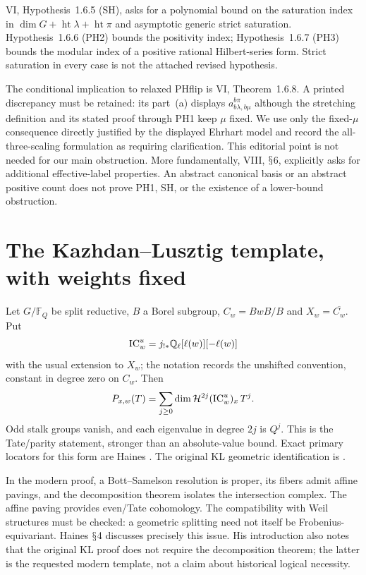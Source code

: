 \documentclass[11pt,a4paper]{article}
\newcommand{\Q}{\mathbb Q}\newcommand{\Z}{\mathbb Z}\newcommand{\C}{\mathbb C}\newcommand{\N}{\mathbb N}\newcommand{\F}{\mathbb F}
\renewcommand{\S}{\ensuremath{\mathsection}}
\theoremstyle{named}\newtheorem{finding}{Finding}[section]
\theoremstyle{definition}\newtheorem{definition}[finding]{Definition}
\theoremstyle{remark}\newtheorem{remark}[finding]{Remark}
\begin{document}
VI, Hypothesis~1.6.5 (SH), asks for a polynomial bound on the saturation index in $\dim G+\operatorname{ht}\lambda+\operatorname{ht}\pi$ and asymptotic generic strict saturation. Hypothesis~1.6.6 (PH2) bounds the positivity index; Hypothesis~1.6.7 (PH3) bounds the modular index of a positive rational Hilbert-series form. Strict saturation in every case is not the attached revised hypothesis.

The conditional implication to relaxed PHflip is VI, Theorem~1.6.8. A printed discrepancy must be retained: its part~(a) displays $a_{b\lambda,b\mu}^{b\pi}$ although the stretching definition and its stated proof through PH1 keep $\mu$ fixed. We use only the fixed-$\mu$ consequence directly justified by the displayed Ehrhart model and record the all-three-scaling formulation as requiring clarification. This editorial point is not needed for our main obstruction. More fundamentally, VIII, \S6, explicitly asks for additional effective-label properties. An abstract canonical basis or an abstract positive count does not prove PH1, SH, or the existence of a lower-bound obstruction.

\section{The Kazhdan--Lusztig template, with weights fixed}\label{sec:KL}
Let $G/\F_Q$ be split reductive, $B$ a Borel subgroup, $C_w=BwB/B$ and $X_w=\overline{C_w}$. Put
\[
 \IC_w^u=j_{!*}\Q_\ell[\ell(w)][-\ell(w)]
\]
with the usual extension to $X_w$; the notation records the unshifted convention, constant in degree zero on $C_w$. Then
\begin{equation}\label{eq:KL}
 P_{x,w}(T)=\sum_{j\ge0}\dim\mathcal H^{2j}(\operatorname{IC}_w^u)_x\,T^j.
\end{equation}
Odd stalk groups vanish, and each eigenvalue in degree $2j$ is $Q^j$. This is the Tate/parity statement, stronger than an absolute-value bound. Exact primary locators for this form are Haines \cite[Theorems 2.0.1, 5.0.4; Proposition 3.0.2; \S4]{Haines}. The original KL geometric identification is \cite[Theorem 4.3]{KL}.

In the modern proof, a Bott--Samelson resolution is proper, its fibers admit affine pavings, and the decomposition theorem isolates the intersection complex. The affine paving provides even/Tate cohomology. The compatibility with Weil structures must be checked: a geometric splitting need not itself be Frobenius-equivariant. Haines \S4 discusses precisely this issue. His introduction also notes that the original KL proof does not require the decomposition theorem; the latter is the requested modern template, not a claim about historical logical necessity.
\end{document}
